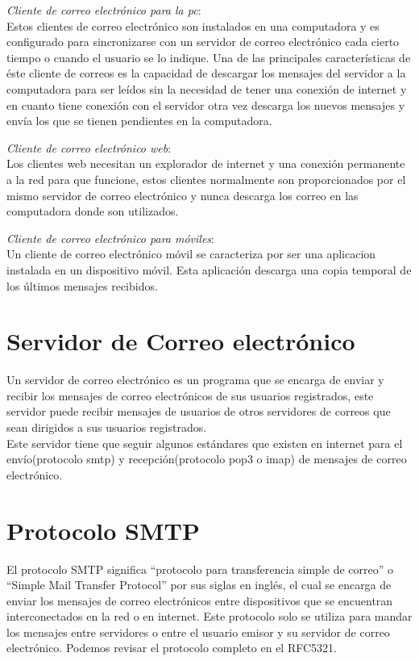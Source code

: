 \documentclass[12pt,oneside,onecolumn,openany]{report}
\begin{document}
\begin{itemize}
 \textit{Cliente de correo electrónico para la pc}:\\
Estos clientes de correo electrónico son instalados en una computadora y es configurado para sincronizarse con un servidor de correo electrónico cada cierto tiempo o cuando el usuario se lo indique. 
Una  de  las  principales  características  de  éste  cliente  de  correos  es  la  capacidad  de descargar los mensajes del servidor a la computadora para ser leídos sin la necesidad de tener  una  conexión  de  internet  y  en  cuanto  tiene  conexión  con  el  servidor  otra  vez 
descarga los nuevos mensajes y envía los que se tienen pendientes en la computadora. 

 \textit{Cliente de correo electrónico web}:\\
Los  clientes  web  necesitan  un  explorador  de  internet  y  una  conexión  permanente  a  la red  para  que  funcione,  estos  clientes  normalmente  son  proporcionados  por  el  mismo servidor de correo electrónico y nunca descarga los correo en las computadora donde son utilizados. 

 \textit{Cliente de correo electrónico para móviles}:\\
Un  cliente  de  correo electrónico  móvil  se  caracteriza  por  ser una  aplicacion  instalada  en  un dispositivo  móvil. Esta aplicación descarga una copia temporal de los últimos mensajes recibidos.  





\end{itemize}

\section{Servidor de Correo electrónico}
Un servidor de correo electrónico es un programa que se encarga de enviar y recibir los mensajes de correo electrónicos de sus usuarios registrados, este servidor puede recibir 
mensajes  de  usuarios  de  otros  servidores  de  correos  que  sean  dirigidos  a  sus  usuarios registrados. \\
Este  servidor  tiene  que  seguir  algunos  estándares  que  existen  en  internet  para  el  envío(protocolo smtp)  y recepción(protocolo pop3 o imap) de mensajes de correo electrónico. 
\section{Protocolo SMTP}
El protocolo SMTP significa “protocolo para transferencia simple de correo” o “Simple Mail  Transfer  Protocol”   por  sus  siglas  en  inglés,  el  cual  se  encarga  de  enviar  los 
mensajes de correo electrónicos entre dispositivos que se encuentran interconectados en la  red  o  en  internet.  Este  protocolo  solo  se  utiliza  para mandar  los  mensajes  entre 
servidores  o  entre  el  usuario  emisor  y  su  servidor  de  correo  electrónico.  Podemos revisar el protocolo completo en el RFC5321\cite{RFC5321}.
\end{document}
